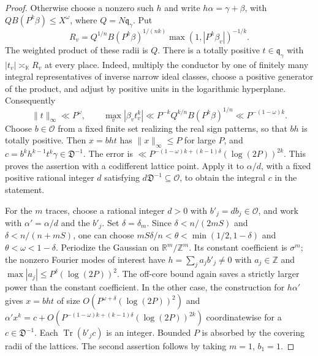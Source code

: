 \documentclass[11pt,letterpaper]{article}
\theoremstyle{definition}
\numberwithin{equation}{section}
\begin{document}
\begin{proof}
Otherwise choose a nonzero such $h$ and write
$h\alpha=\gamma+\beta$, with $QB(P^k\beta)\le X^{\omega}$,
where $Q=N\mathfrak q_\gamma$. Put
\[
 R_v=Q^{1/n} B(P^k\beta)^{1/(nk)}
                 \max(1,|P^k\beta_v|)^{-1/k}.
\]
The weighted product of these radii is $Q$. There is a totally
positive $t\in\mathfrak q_\gamma$ with $|t_v|\asymp_{\mathbb K}R_v$
at every place. Indeed, multiply the conductor by one of finitely
many integral representatives of inverse narrow ideal classes,
choose a positive generator of the product, and adjust by positive
units in the logarithmic hyperplane. Consequently
\[
 \|t\|_\infty\ll P^{\omega},\qquad
 \max_v|\beta_vt_v^k|\ll P^{-k}Q^{k/n}B(P^k\beta)^{1/n}
                           \ll P^{-(1-\omega)k}.
\]
Choose $b\in\mathcal O$ from a fixed finite set realizing the
real sign patterns, so that $bh$ is totally positive. Then $x=bht$
has $\|x\|_\infty\le P$ for large $P$, and
$c=b^kh^{k-1}t^k\gamma\in\mathfrak D^{-1}$. The error is
$\ll P^{-(1-\omega)k+(k-1)\delta}(\log(2P))^{2k}$.
This proves the assertion with a codifferent lattice point.
Apply it to $\alpha/d$, with a fixed positive rational integer
$d$ satisfying $d\mathfrak D^{-1}\subseteq\mathcal O$, to obtain
the integral $c$ in the statement.

For the $m$ traces, choose a rational integer $d>0$ with
$b'_j=db_j\in\mathcal O$, and work with $\alpha' = \alpha/d$ and
the $b'_j$. Set $\delta=\delta_m$. Since
$\delta<n/(2mS)$ and $\delta<n/(n+mS)$, one can choose
$mS\delta/n<\theta<\min(1/2,1-\delta)$ and
$\theta<\omega<1-\delta$. Periodize the Gaussian on
$\mathbb R^m/\mathbb Z^m$. Its constant coefficient is $\sigma^m$;
the nonzero Fourier modes of interest have
$h=\sum_j a_jb'_j\ne0$ with $a_j\in\mathbb Z$ and
$\max|a_j|\le P^\delta(\log(2P))^2$. The off-core bound again
saves a strictly larger power than the constant coefficient. In the
other case, the construction for $h\alpha'$ gives
$x=bht$ of size $O(P^{\omega+\delta}(\log(2P))^2)$ and
$\alpha' x^k=c+O(P^{-(1-\omega)k+(k-1)\delta}(\log(2P))^{2k})$
coordinatewise for a $c\in\mathfrak D^{-1}$. Each
$\operatorname{Tr}(b'_jc)$ is an integer. Bounded $P$ is absorbed
by the covering radii of the lattices. The second assertion follows
by taking $m=1$, $b_1=1$.
\end{proof}
\end{document}
